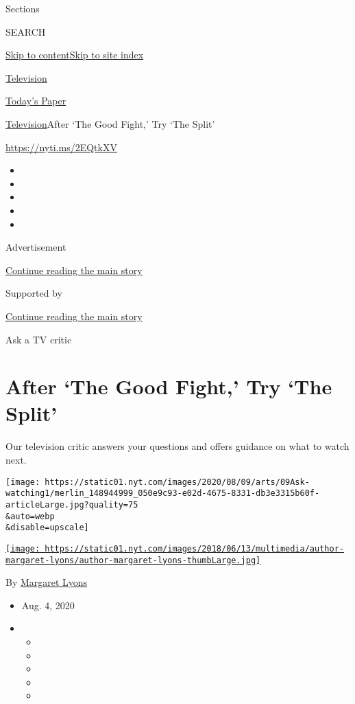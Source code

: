 Sections

SEARCH

\protect\hyperlink{site-content}{Skip to
content}\protect\hyperlink{site-index}{Skip to site index}

\href{https://www.nytimes.com/section/arts/television}{Television}

\href{https://myaccount.nytimes.com/auth/login?response_type=cookie\&client_id=vi}{}

\href{https://www.nytimes.com/section/todayspaper}{Today's Paper}

\href{/section/arts/television}{Television}\textbar{}After `The Good
Fight,' Try `The Split'

\url{https://nyti.ms/2EQtkXV}

\begin{itemize}
\item
\item
\item
\item
\item
\end{itemize}

Advertisement

\protect\hyperlink{after-top}{Continue reading the main story}

Supported by

\protect\hyperlink{after-sponsor}{Continue reading the main story}

Ask a TV critic

\hypertarget{after-the-good-fight-try-the-split}{%
\section{After `The Good Fight,' Try `The
Split'}\label{after-the-good-fight-try-the-split}}

Our television critic answers your questions and offers guidance on what
to watch next.

\texttt{[image: https://static01.nyt.com/images/2020/08/09/arts/09Ask-watching1/merlin\_148944999\_050e9c93-e02d-4675-8331-db3e3315b60f-articleLarge.jpg?quality=75\\\&auto=webp\\\&disable=upscale]}

\href{https://www.nytimes.com/by/margaret-lyons}{\texttt{[image: https://static01.nyt.com/images/2018/06/13/multimedia/author-margaret-lyons/author-margaret-lyons-thumbLarge.jpg]}}

By \href{https://www.nytimes.com/by/margaret-lyons}{Margaret Lyons}

\begin{itemize}
\item
  Aug. 4, 2020
\item
  \begin{itemize}
  \item
  \item
  \item
  \item
  \item
  \end{itemize}
\end{itemize}


